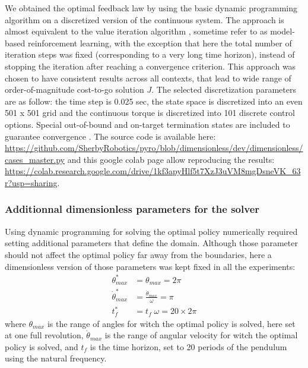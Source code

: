 We obtained the optimal feedback law by using the basic dynamic programming algorithm \cite{bertsekas_dynamic_2012} on a discretized version of the continuous system. The approach is almost equivalent to the value iteration  algorithm \cite{sutton_reinforcement_2018}, sometime refer to as model-based reinforcement learning, with the exception that here the total number of iteration steps was  fixed (corresponding to a very long time horizon), instead of stopping the iteration after reaching a convergence criterion. This approach was chosen to have consistent results across all contexts, that lead to wide range of order-of-magnitude cost-to-go solution $J$. The selected discretization parameters are as follow:
the time step is 0.025 sec, the state space is discretized into an even 501 x 501 grid and the continuous torque is discretized into 101 discrete control options. Special out-of-bound and on-target termination states are included to
guarantee convergence \cite{bertsekas_dynamic_2012}. The source code is available here: \url{https://github.com/SherbyRobotics/pyro/blob/dimensionless/dev/dimensionless/cases_master.py} and this google colab page allow reproducing the results: \url{https://colab.research.google.com/drive/1kf3apyHlf5t7XzJ3uVM8mgDsneVK_63r?usp=sharing}.


\subsubsection{Additionnal dimensionless parameters for the solver}

Using dynamic programming for solving the optimal policy numerically required setting additional parameters that define the domain. Although those parameter should not affect the optimal policy far away from the boundaries, here a dimensionless version of those parameters was kept fixed in all the experiments:
\begin{align}
\theta^*_{max} &= \theta_{max} = 2 \pi \\
\dot{\theta}^*_{max} &= \frac{ \dot{\theta}_{max} }{\omega} = \pi \\
t^*_{f} &= t_{f} \; \omega = 20 \times 2 \pi 
\end{align}
where $\theta_{max}$ is the range of angles for witch the optimal policy is solved, here set at one full revolution, $\dot{\theta}_{max}$ is the range of angular velocity for witch the optimal policy is solved, and $t_{f}$ is the time horizon, set to 20 periods of the pendulum using the natural frequency.



